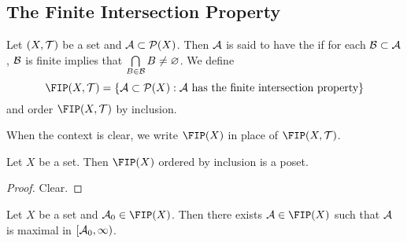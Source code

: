 \documentclass{book}
\begin{document}
	
	
	
	
	
	
	
	
	
	
	
	
	
	
	
	
		

	






















	\subsection{The Finite Intersection Property} 
	
	\begin{defn} 
		Let $(X, \mathcal{T})$ be a set and $\mathcal{A} \subset \mathcal{P}(X)$. Then $\mathcal{A}$ is said to have the  if for each $\mathcal{B} \subset \mathcal{A}$, $\mathcal{B}$ is finite implies that $\bigcap\limits_{B \in \mathcal{B}} B \neq \varnothing$. We define 
		$$\FIP(X, \MT) = \{\MA \subset \MP(X): \MA \text{ has the finite intersection property} \}$$ 
		and order $\FIP(X, \MT)$ by inclusion. 
	\end{defn}

	\begin{note}
		When the context is clear, we write $\FIP(X)$ in place of $\FIP(X, \MT)$.
	\end{note}

	\begin{ex} 
		Let $X$ be a set. Then $\FIP(X)$ ordered by inclusion is a poset.
	\end{ex}

	\begin{proof}
		Clear.
	\end{proof}

	\begin{ex} 
		Let $X$ be a set and $\MA_0 \in \FIP(X)$. Then there exists $\MA \in \FIP(X)$ such that $\mathcal{A}$ is maximal in $[\mathcal{A}_0, \infty)$. 
	\end{ex}
\end{document}
